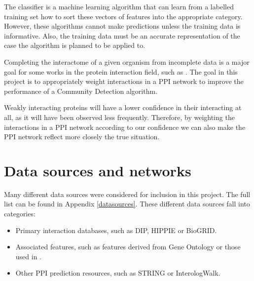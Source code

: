 The classifier is a machine learning algorithm that can learn from a labelled training set how to sort these vectors of features into the appropriate category. %
However, these algorithms cannot make predictions unless the training data is informative.
Also, the training data must be an accurate representation of the case the algorithm is planned to be applied to.

Completing the interactome of a given organism from incomplete data is a major goal for some works in the protein interaction field, such as \textcite{rodgers-melnick_predicting_2013}.
The goal in this project is to appropriately weight interactions in a PPI network to improve the performance of a Community Detection algorithm.

Weakly interacting proteins will have a lower confidence in their interacting at all, as it will have been observed less frequently.
Therefore, by weighting the interactions in a PPI network according to our confidence we can also make the PPI network reflect more closely the true situation.

\section{Data sources and networks}
\label{back:sources}

Many different data sources were considered for inclusion in this project.
The full list can be found in Appendix \ref{datasources}.
These different data sources fall into categories:

\begin{itemize}
    \item Primary interaction databases, such as DIP\autocite{xenarios_dip_2002}, HIPPIE\autocite{schaefer_hippie:_2012} or BioGRID\autocite{stark_biogrid:_2006}.
    \item Associated features, such as features derived from Gene Ontology\autocite{ashburner_gene_2000} or those used in \textcite{rodgers-melnick_predicting_2013}.
    \item Other PPI prediction resources, such as STRING\autocite{vonMering_string_2005} or InterologWalk\autocite{gallone_bio::homology::interologwalk_2011}.
\end{itemize}

